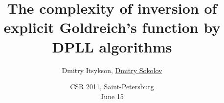 

\title[\insertframenumber/\inserttotalframenumber~|~
Inversion of Goldreich's function]{The complexity of inversion of
	explicit Goldreich's function by DPLL algorithms}
\author[Sokolov D.]{Dmitry Itsykson, \underline{Dmitry Sokolov}}


\date{CSR 2011, Saint-Petersburg \\
	June 15}



	\maketitle

	




